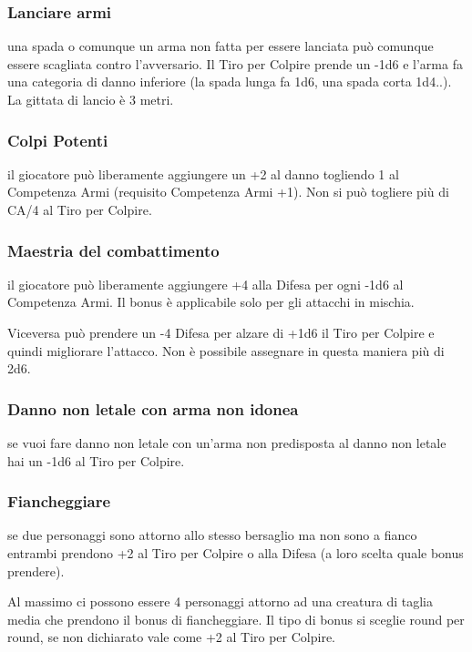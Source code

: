 \documentclass[a4paper,11pt,twoside,openany]{book}
\begin{document}
\subsubsection{Lanciare armi} una spada o comunque un arma non fatta per essere lanciata può comunque essere scagliata contro l'avversario.
Il Tiro per Colpire prende un -1d6 e l'arma fa una categoria di danno inferiore (la spada lunga fa 1d6, una spada corta 1d4..). La gittata di lancio è 3 metri.

\subsubsection{Colpi Potenti} il giocatore può liberamente aggiungere un +2 al danno togliendo 1 al Competenza Armi (requisito Competenza Armi +1). Non si può togliere più di CA/4 al Tiro per Colpire.

\subsubsection{Maestria del combattimento} il giocatore può liberamente aggiungere +4 alla Difesa per ogni -1d6 al Competenza Armi. Il bonus è applicabile solo per gli attacchi in mischia.

Viceversa può prendere un -4 Difesa per alzare di +1d6 il Tiro per Colpire e quindi migliorare l'attacco. Non è possibile assegnare in questa maniera più di 2d6.

\subsubsection{Danno non letale con arma non idonea} se vuoi fare danno non letale con un'arma non predisposta al danno non letale hai un -1d6 al Tiro per Colpire.

\subsubsection{Fiancheggiare} se due personaggi sono attorno allo stesso bersaglio ma non sono a fianco entrambi prendono +2 al Tiro per Colpire o alla Difesa (a loro scelta quale bonus prendere).

Al massimo ci possono essere 4 personaggi attorno ad una creatura di taglia media che prendono il bonus di fiancheggiare. Il tipo di bonus si sceglie round per round, se non dichiarato vale come +2 al Tiro per Colpire.
\end{document}
